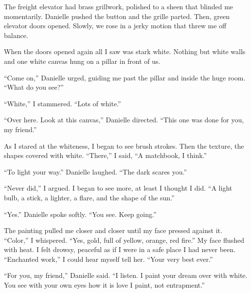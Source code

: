 \documentclass[
]{article}
\begin{document}
The freight elevator had brass grillwork, polished to a sheen that
blinded me momentarily. Danielle pushed the button and the grille
parted. Then, green elevator doors opened. Slowly, we rose in a jerky
motion that threw me off balance.

When the doors opened again all I saw was stark white. Nothing but white
walls and one white canvas hung on a pillar in front of us.

``Come on,'' Danielle urged, guiding me past the pillar and inside the
huge room. ``What do you see?''

``White,'' I stammered. ``Lots of white.''

``Over here. Look at this canvas,'' Danielle directed. ``This one was
done for you, my friend.''

As I stared at the whiteness, I began to see brush strokes. Then the
texture, the shapes covered with white. ``There,'' I said, ``A
matchbook, I think.''

``To light your way.'' Danielle laughed. ``The dark scares you.''

``Never did,'' I argued. I began to see more, at least I thought I did.
``A light bulb, a stick, a lighter, a flare, and the shape of the sun.''

``Yes.'' Danielle spoke softly. ``You see. Keep going.''

The painting pulled me closer and closer until my face pressed against
it. ``Color,'' I whispered. ``Yes, gold, full of yellow, orange, red
fire.'' My face flushed with heat. I felt drowsy, peaceful as if I were
in a safe place I had never been. ``Enchanted work,'' I could hear
myself tell her. ``Your very best ever.''

``For you, my friend,'' Danielle said. ``I listen. I paint your dream
over with white. You see with your own eyes how it is love I paint, not
entrapment.''
\end{document}
